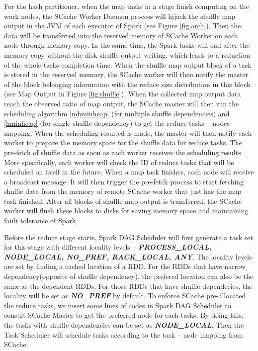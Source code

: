 For the hash partitioner, when the map tasks in a stage finish computing on the work nodes, the  SCache Worker Daemon process will hijack the shuffle map output in the JVM of each executor of Spark (see Figure \ref{fig:arch}). Then the data will be transferred into the reserved memory of SCache Worker on each node through memory copy. In the same time, the Spark tasks will end after the memory copy without the disk shuffle output writing, which leads to a  reduction of the whole tasks completion time. When the shuffle map output block of a task is stored in the reserved memory, the SCache worker will then notify the master of the block belonging information with the reduce size distribution in this block (see Map Output in Figure \ref{fig:shuffle}). When the collected map output data reach the observed ratio of map output, the SCache master will then run the scheduling algorithm \ref{mhminheap} (for multiple shuffle dependencies) and \ref{hminheap} (for single shuffle dependency) to get the reduce tasks -- nodes mapping. When the scheduling resulted is made, the master will then notify each worker to prepare the memory space for the shuffle data for reduce tasks. The pre-fetch of shuffle data as soon as each worker receives the scheduling results. More specifically, each worker will check the ID of reduce tasks that will be scheduled on itself in the future. When a map task finishes, each node will receive a broadcast message. It will then trigger the pre-fetch process to start fetching shuffle data from the memory of remote SCache worker that just has the map task finished. After all blocks of shuffle map output is transferred, the SCache worker will flush these blocks to disks for saving memory space and maintaining fault tolerance of Spark. 

Before the reduce stage starts, Spark DAG Scheduler will first generate a task set for this stage with different locality levels -- \textbf{\textit{PROCESS\_LOCAL, NODE\_LOCAL, NO\_PREF, RACK\_LOCAL, ANY}}. The locality levels are set by finding a cached location of a RDD. For the RDDs that have narrow dependency(opposite of shuffle dependency), the prefered location can also be the same as the dependent RDDs. For those RDDs that have shuffle dependecies, the locality will be set as \textbf{\textit{NO\_PREF}} by default. To enforce SCache pre-allocated the reduce tasks, we insert some lines of codes in Spark DAG Scheduler to consult SCache Master to get the preferred node for each tasks. By doing this, the tasks with shuffle dependencies can be set as \textbf{\textit{NODE\_LOCAL}}. Then the Task Scheduler will schedule tasks according to the task -- node mapping from SCache. 

